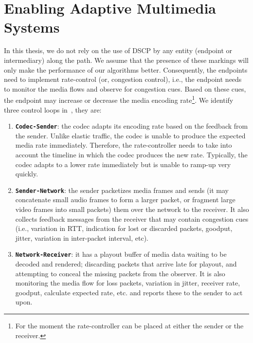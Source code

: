 \section{Enabling Adaptive Multimedia Systems}
\label{rg.title}

In this thesis, we do not rely on the use of DSCP by any entity (endpoint or
intermediary) along the path. We assume that the presence of these markings
will only make the performance of our algorithms better. Consequently, the
endpoints need to implement rate-control (or, congestion control), i.e., the
endpoint needs to monitor the media flows and observe for congestion cues.
Based on these cues, the endpoint may increase or decrease the media encoding
rate\footnote{For the moment the rate-controller can be placed at either the
sender or the receiver.}. We identify three control loops
in~\cite{Singh:control.loops.api}, they are:

\begin{enumerate}
\setlength{\itemsep}{0pt}

\item \textbf{\texttt{Codec-Sender}}: the codec adapts its encoding rate based
on the feedback from the sender. Unlike elastic traffic, the codec is unable
to produce the expected media rate immediately. Therefore, the rate-controller
needs to take into account the timeline in which the codec produces the new
rate. Typically, the codec adapts to a lower rate immediately but is unable to
ramp-up very quickly.

\item \textbf{\texttt{Sender-Network}}: the sender packetizes media frames and
sends (it may concatenate small audio frames to form a larger packet, or
fragment large video frames into small packets) them over the network to the
receiver. It also collects feedback messages from the receiver that may
contain congestion cues (i.e., variation in RTT, indication for lost or
discarded packets, goodput, jitter, variation in inter-packet interval, etc).

\item \textbf{\texttt{Network-Receiver}}: it has a playout buffer of media
data waiting to be decoded and rendered; discarding packets that arrive late
for playout, and attempting to conceal the missing packets from the observer.
It is  also monitoring the media flow for loss packets, variation in jitter,
receiver rate, goodput, calculate expected rate, etc. and reports these to the
sender to act upon.

\end{enumerate}

